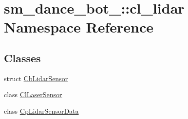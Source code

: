 \hypertarget{namespacesm__dance__bot__2_1_1cl__lidar}{}\section{sm\+\_\+dance\+\_\+bot\+\_\+:\+:cl\+\_\+lidar Namespace Reference}
\label{namespacesm__dance__bot__2_1_1cl__lidar}
\subsection*{Classes}
\begin{DoxyCompactItemize}
\item 
struct \hyperlink{structsm__dance__bot__2_1_1cl__lidar_1_1CbLidarSensor}{Cb\+Lidar\+Sensor}
\item 
class \hyperlink{classsm__dance__bot__2_1_1cl__lidar_1_1ClLaserSensor}{Cl\+Laser\+Sensor}
\item 
class \hyperlink{classsm__dance__bot__2_1_1cl__lidar_1_1CpLidarSensorData}{Cp\+Lidar\+Sensor\+Data}
\end{DoxyCompactItemize}
